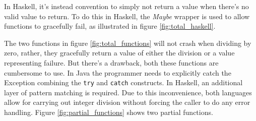 \begin{figure}
\end{figure}


In Haskell, it's instead convention to simply not return a value when there's
no valid value to return. To do this in Haskell, the \emph{Maybe} wrapper is
used to allow functions to gracefully fail, as illustrated in figure
\ref{fig:total_haskell}.

The two functions in figure \ref{fig:total_functions} will not crash when dividing
by zero, rather, they gracefully return a value of either the division or a
value representing failure. But there's a drawback, both these functions are
cumbersome to use. In Java the programmer needs to explicitly catch the
Exception %
combining the \texttt{try} and \texttt{catch} constructs.
\cite{oracle_java_doc_catch} In Haskell, an additional layer of pattern
matching is required. Due to this inconvenience, both languages allow for
carrying out integer division without forcing the caller to do any error
handling. Figure \ref{fig:partial_functions} shows two partial functions.

